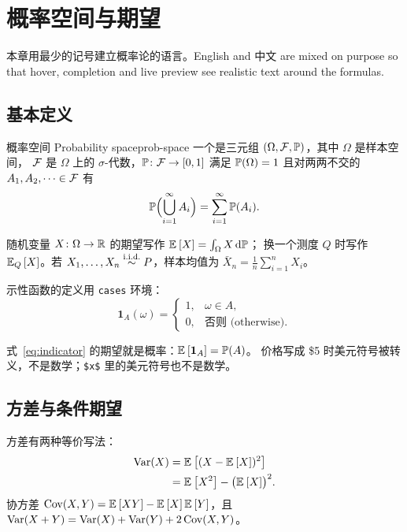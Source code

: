 \chapter{概率空间与期望}\label{chap:prob}

本章用最少的记号建立概率论的语言。English and 中文 are mixed on purpose so that
hover, completion and live preview see realistic text around the formulas.

\section{基本定义}\label{sec:prob-basics}

\begin{definition}{概率空间 Probability space}{prob-space}
  一个是三元组 $(\Omega, \sigmaF, \Prob)$，其中 $\Omega$ 是样本空间，
  $\sigmaF$ 是 $\Omega$ 上的 $\sigma$-代数，$\Prob\colon \sigmaF \to [0,1]$ 满足
  $\Prob(\Omega) = 1$ 且对两两不交的 $A_1, A_2, \dots \in \sigmaF$ 有
  \[
    \Prob\Bigl(\bigcup_{i=1}^{\infty} A_i\Bigr) = \sum_{i=1}^{\infty} \Prob(A_i).
  \]
\end{definition}

随机变量 $X\colon \Omega \to \R$ 的期望写作 $\E{X} = \int_\Omega X \dd\Prob$；
换一个测度 $Q$ 时写作 $\E[Q]{X}$。若 $X_1, \dots, X_n \iid P$，样本均值为
\(\bar X_n = \frac{1}{n}\sum_{i=1}^n X_i\)。

示性函数的定义用 \texttt{cases} 环境：
\begin{equation}\label{eq:indicator}
  \mathbf{1}_A(\omega) =
  \begin{cases}
    1, & \omega \in A, \\
    0, & \text{否则 (otherwise)}.
  \end{cases}
\end{equation}

\begin{note}
  式~\eqref{eq:indicator} 的期望就是概率：$\E{\mathbf{1}_A} = \Prob(A)$。
  价格写成 \$5 时美元符号被转义，不是数学；\verb|$x$| 里的美元符号也不是数学。
\end{note}


\section{方差与条件期望}\label{sec:variance}

方差有两种等价写法：
\begin{align}
  \Var(X) &= \E{(X - \E{X})^2} \label{eq:var-def} \\
          &= \E{X^2} - \bigl(\E{X}\bigr)^2. \label{eq:var-short}
\end{align}
协方差 $\Cov(X, Y) = \E{XY} - \E{X}\E{Y}$，且 $\Var(X + Y) = \Var(X) + \Var(Y) + 2\Cov(X, Y)$。

